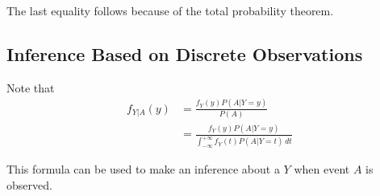 The last equality follows because of the total probability theorem.

\subsection{Inference Based on Discrete Observations}
Note that
\begin{align*}
    f_{Y|A}(y) &= \frac{f_Y(y)P(A|Y=y)}{P(A)} \\
               &= \frac{f_Y(y)P(A|Y=y)}{\int_{-\infty}^{+\infty}f_Y(t)P(A|Y=t) \, dt}
\end{align*}

This formula can be used to make an inference about a \rv $Y$ when event $A$ is observed. 